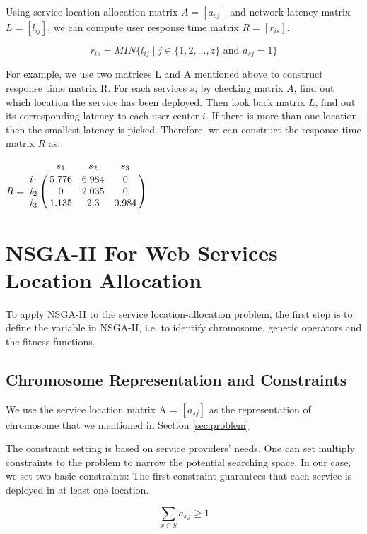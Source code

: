 \documentclass{llncs}
\let\bbordermatrix\bordermatrix
\begin{document}
Using service location allocation matrix $A = [a_{sj}]$ and network latency matrix $L = [l_{ij}]$, we can compute user
response time matrix $R = [r_{is}]$. 
\begin{center}
	\begin{equation}
		r_{is} = MIN\{l_{ij} \mid j \in \{1, 2, ..., z\} \text{ and } a_{sj} = 1\}
	\end{equation}
\end{center}

For example, we use two matrices L and A mentioned above to construct response time matrix R. 
For each services $s$, by checking matrix $A$, find out which location the service has been deployed.
Then look back matrix $L$, find out its corresponding latency to each user center $i$. If there is
more than one location, then the smallest latency is picked. Therefore, we can construct the response time matrix $R$ as:
\begin{center}
$
R = \bbordermatrix{~ & s_{1} & s_{2} & s_{3}\cr
					i_{1}	&5.776 &6.984 &0	\cr
					i_{2}	&0  &2.035 &0	\cr
					i_{3}	&1.135 &2.3 &0.984	\cr}
$
\end{center}




\section{NSGA-II For Web Services Location Allocation}
\label{sec:algorithm_des}
To apply NSGA-II to the service location-allocation problem, the first step is to define the variable in NSGA-II, i.e. to
identify chromosome, genetic operators and the fitness functions.

\subsection{Chromosome Representation and Constraints}
We use the service location matrix A = $[a_{sj}]$ as the representation of chromosome that we mentioned in Section 
\ref{sec:problem}.

The constraint setting is based on service providers' needs. One can set multiply constraints to the problem to narrow the potential searching space.
In our case, we set two basic constraints: The first constraint guarantees that each service is deployed in at 
least one location.
\begin{center}
	\begin{equation}
		\sum\limits_{x \in S} a_{xj} \geq 1
	\end{equation}
\end{center}
\end{document}
